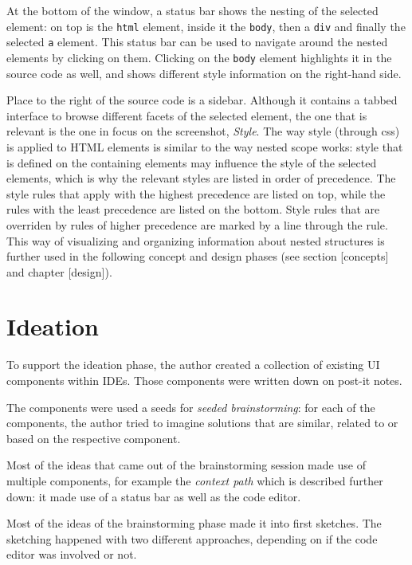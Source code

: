 At the bottom of the window, a status bar shows the nesting of the
selected element: on top is the \texttt{html} element, inside it the
\texttt{body}, then a \texttt{div} and finally the selected \texttt{a}
element. This status bar can be used to navigate around the nested
elements by clicking on them. Clicking on the \texttt{body} element
highlights it in the source code as well, and shows different style
information on the right-hand side.

Place to the right of the source code is a sidebar. Although it contains
a tabbed interface to browse different facets of the selected element,
the one that is relevant is the one in focus on the screenshot,
\emph{Style}. The way style (through \ac{css}) is applied to HTML
elements is similar to the way nested scope works: style that is defined
on the containing elements may influence the style of the selected
elements, which is why the relevant styles are listed in order of
precedence. The style rules that apply with the highest precedence are
listed on top, while the rules with the least precedence are listed on
the bottom. Style rules that are overriden by rules of higher precedence
are marked by a line through the rule. This way of visualizing and
organizing information about nested structures is further used in the
following concept and design phases (see section {[}concepts{]} and
chapter {[}design{]}).

\section{Ideation}\label{ideation}

To support the ideation phase, the author created a collection of
existing UI components within IDEs. Those components were written down
on post-it notes.

The components were used a seeds for \emph{seeded brainstorming}: for
each of the components, the author tried to imagine solutions that are
similar, related to or based on the respective component.

Most of the ideas that came out of the brainstorming session made use of
multiple components, for example the \emph{context path} which is
described further down: it made use of a status bar as well as the code
editor.

Most of the ideas of the brainstorming phase made it into first
sketches. The sketching happened with two different approaches,
depending on if the code editor was involved or not.

